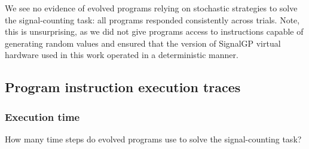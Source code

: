 \documentclass[]{book}
\begin{document}
We see no evidence of evolved programs relying on stochastic strategies to solve the signal-counting task: all programs responded consistently across trials.
Note, this is unsurprising, as we did not give programs access to instructions capable of generating random values and ensured that the version of SignalGP virtual hardware used in this work operated in a deterministic manner.

\hypertarget{program-instruction-execution-traces}{%
\subsection{Program instruction execution traces}\label{program-instruction-execution-traces}}

\hypertarget{execution-time}{%
\subsubsection{Execution time}\label{execution-time}}

How many time steps do evolved programs use to solve the signal-counting task?
\end{document}
